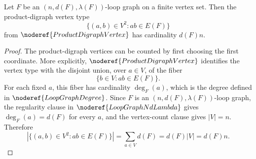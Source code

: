 \begin{helper}
Let \(F\) be an \((n,d(F),\lambda(F))\)-loop graph on a finite vertex set.
Then the product-digraph vertex type
\[
  \{(a,b)\in V^2:ab\in E(F)\}
\]
from \(\noderef{ProductDigraphVertex}\) has cardinality \(d(F)n\).
\end{helper}
\begin{proof}
The product-digraph vertices can be counted by first choosing the first
coordinate.  More explicitly, \(\noderef{ProductDigraphVertex}\) identifies
the vertex type with the disjoint union, over \(a\in V\), of the fiber
\[
  \{b\in V:ab\in E(F)\}.
\]
For each fixed \(a\), this fiber has cardinality
\(\deg_F(a)\), which is the degree defined in \(\noderef{LoopGraphDegree}\).
Since \(F\) is an \((n,d(F),\lambda(F))\)-loop graph, the regularity clause in
\(\noderef{LoopGraphNdLambda}\) gives \(\deg_F(a)=d(F)\) for every \(a\), and
the vertex-count clause gives \(|V|=n\).  Therefore
\[
  \left|\{(a,b)\in V^2:ab\in E(F)\}\right|
  =\sum_{a\in V} d(F)
  =d(F)|V|
  =d(F)n.
\]
\end{proof}
